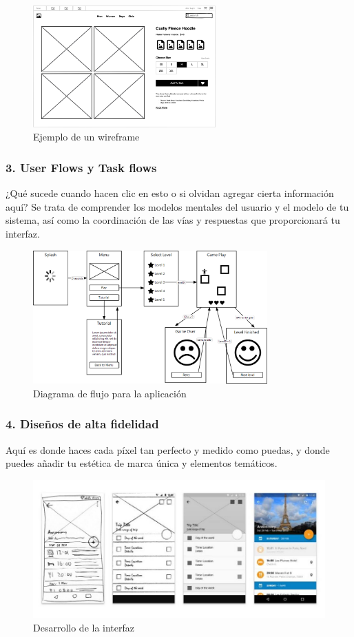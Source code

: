 \documentclass[11pt]{article}
\begin{document}
\begin{figure}[htbp]
\centering
\includegraphics[width=7cm]{images/wireframe.png}
\caption{Ejemplo de un wireframe}
\end{figure}

\subsubsection{3. User Flows y Task flows}
\label{sec:orgf8dcda0}
¿Qué sucede cuando hacen clic en esto o si olvidan agregar cierta información
aquí? Se trata de comprender los modelos mentales del usuario y el modelo de tu
sistema, así como la coordinación de las vías y respuestas que proporcionará tu 
interfaz.

\begin{figure}[htbp]
\centering
\includegraphics[width=9cm]{images/userflow.png}
\caption{Diagrama de flujo para la aplicación}
\end{figure}

\subsubsection{4. Diseños de alta fidelidad}
\label{sec:orgf012bbf}
Aquí es donde haces cada píxel tan perfecto y medido como puedas, y donde 
puedes añadir tu estética de marca única y elementos temáticos.

\begin{figure}[htbp]
\centering
\includegraphics[width=13cm]{images/hightfidelity.jpg}
\caption{Desarrollo de la interfaz}
\end{figure}
\end{document}
